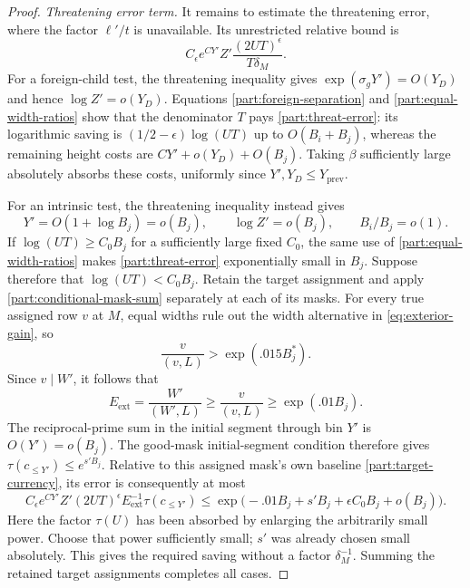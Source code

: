 \begin{proof}
\emph{Threatening error term.}\quad
It remains to estimate the threatening error, where the factor
$\ell'/t$ is unavailable.  Its unrestricted relative bound is
\begin{equation}
 C_\epsilon e^{CY'}Z'
       \frac{(2UT)^\epsilon}{T\delta_M}.
\label{part:threat-error}
\end{equation}
For a foreign-child test, the threatening inequality gives
$\exp(\sigma_gY')=O(Y_D)$ and hence
$\log Z'=o(Y_D)$.  Equations
\eqref{part:foreign-separation} and
\eqref{part:equal-width-ratios} show that the denominator $T$ pays
\eqref{part:threat-error}: its logarithmic saving is
$(1/2-\epsilon)\log(UT)$ up to $O(B_i+B_j)$, whereas the
remaining height costs are $CY'+o(Y_D)+O(B_j)$.
Taking $\beta$ sufficiently large absolutely absorbs these costs,
uniformly since $Y',Y_D\le Y_{\mathrm{prev}}$.

For an intrinsic test, the threatening inequality instead gives
\[
 Y'=O(1+\log B_j)=o(B_j),\qquad
 \log Z'=o(B_j),\qquad B_i/B_j=o(1).
\]
If $\log(UT)\ge C_0B_j$ for a sufficiently large fixed $C_0$,
the same use of \eqref{part:equal-width-ratios} makes
\eqref{part:threat-error} exponentially small in $B_j$.
Suppose therefore that $\log(UT)<C_0B_j$.  Retain the target
assignment and apply \eqref{part:conditional-mask-sum} separately
at each of its masks.  For every true assigned row $v$ at $M$,
equal widths rule out the width alternative in
\eqref{eq:exterior-gain}, so
\[
 \frac{v}{(v,L)}>\exp(.015B_j^*).
\]
Since $v\mid W'$, it follows that
\[
 E_{\mathrm{ext}}=\frac{W'}{(W',L)}
       \ge \frac{v}{(v,L)}\ge \exp(.01B_j).
\]
The reciprocal-prime sum in the initial segment through bin $Y'$
is $O(Y')=o(B_j)$.  The good-mask initial-segment condition
therefore gives $\tau(c_{\le Y'})\le e^{s'B_j}$.
Relative to this assigned mask's own baseline
\eqref{part:target-currency}, its error is consequently at most
\[
 C_\epsilon e^{CY'}Z'(2UT)^\epsilon
 E_{\mathrm{ext}}^{-1}\tau(c_{\le Y'})
 \le \exp\bigl(-.01B_j+s'B_j+\epsilon C_0B_j+o(B_j)\bigr).
\]
Here the factor $\tau(U)$ has been absorbed by enlarging the
arbitrarily small power.  Choose that power sufficiently small;
$s'$ was already chosen small absolutely.  This gives the required
saving without a factor $\delta_M^{-1}$.  Summing the retained
target assignments completes all cases.
\end{proof}

